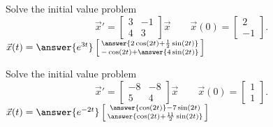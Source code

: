 \documentclass{ximera}
\begin{document}
\begin{exercise}
    Solve the initial value problem
    \[ 
        {\vec{x}}' = 
        \begin{bmatrix} 
            3 & -1 \\ 
            4 & 3 
        \end{bmatrix} 
        \vec{x} \qquad \vec{x}(0) = 
        \begin{bmatrix} 
            2 \\ 
            -1 
        \end{bmatrix}. 
    \]
    $\vec{x}(t) = \answer{e^{3t}} \left[\begin{smallmatrix} \answer{2\cos(2t) + \frac{1}{2}\sin(2t)} \\ -\cos(2t) + \answer{4\sin(2t)} \end{smallmatrix}\right]$
\end{exercise}


\begin{exercise}
    Solve the initial value problem
    \[ 
        {\vec{x}}' = 
        \begin{bmatrix} 
            -8 & -8 \\ 
            5 & 4 
        \end{bmatrix} 
        \vec{x} \qquad \vec{x}(0) = 
        \begin{bmatrix} 
            1 \\ 
            1 
        \end{bmatrix}. 
    \]
    $\vec{x}(t) = \answer{e^{-2t}}\left[\begin{smallmatrix} \answer{\cos(2t)} - 7\sin(2t)\\ \answer{\cos(2t) + \frac{11}{2}\sin(2t)} \end{smallmatrix}\right]$
\end{exercise}
\end{document}
